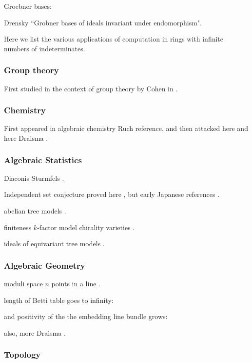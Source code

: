 

Groebner bases:

Drensky ``Grobner bases of ideals invariant under endomorphism".




Here we list the various applications of computation in rings with infinite numbers of indeterminates.  

\subsubsection{Group theory}

First studied in the context of group theory by Cohen in \cite{cohen1967laws}.

\subsubsection{Chemistry}

First appeared in algebraic chemistry \cite{} Ruch reference, and then attacked here \cite{aschenbrenner2007finite} and here Draisma \cite{Draisma08b}.

\subsubsection{Algebraic Statistics}

Diaconis Sturmfels \cite{diaconis1998algebraic}.

Independent set conjecture proved here \cite{hillar2012finite}, but early Japanese references \cite{}.

abelian tree models \cite{draisma2015finiteness}.

finiteness $k$-factor model chirality varieties \cite{Draisma08b}.

ideals of equivariant tree models \cite{draisma2009ideals}.

\subsubsection{Algebraic Geometry}

moduli space $n$ points in a line \cite{howard2009equations}.

length of Betti table goes to infinity: \cite{ein2015asymptotics}

and positivity of the the embedding line bundle grows: \cite{ein2012asymptotic}

also, more Draisma \cite{draisma2015plucker}.

\subsubsection{Topology}

